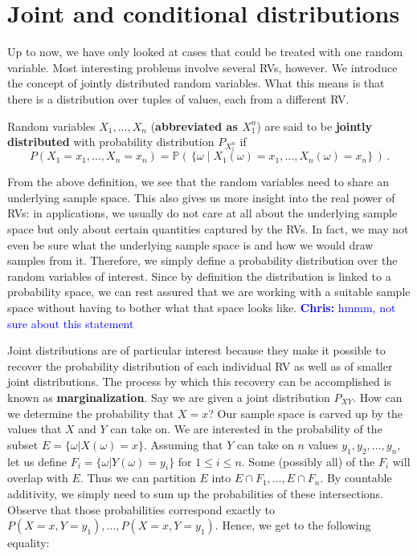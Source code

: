 \documentclass[a4paper,11pt,leqno]{report}
\newcommand{\chris}[1]{ \textcolor{blue}{\textbf{Chris:} #1}}
\begin{document}
\section{Joint and conditional distributions}

Up to now, we have only looked at cases that could be treated with one random variable. Most interesting problems involve several RVs, however. We introduce the concept of jointly distributed random variables. What this means is that
there is a distribution over tuples of values, each from a different RV.

\begin{Definition}
Random variables $ X_{1}, \ldots, X_{n} $ (\textbf{abbreviated as $ X^{n}_{1} $}) 
are said to be \textbf{jointly distributed} with probability distribution $ P_{X_{1}^{n}} $ if
$$ P(X_{1}=x_{1}, \ldots, X_{n}=x_{n}) = \mathbb{P}(\, \{\omega \mid
X_{1}(\omega) = x_{1}, \ldots, X_{n}(\omega)=x_{n}\}\, ) \, . $$ 
\end{Definition}

From the above definition, we see that the random variables need to
share an underlying sample space. This also gives us more insight into
the real power of RVs: in applications, we usually do not care at all
about the underlying sample space but only about certain quantities
captured by the RVs. In fact, we may not even be sure what the
underlying sample space is and how we would draw samples from
it. Therefore, we simply define a probability distribution over the
random variables of interest. Since by definition the distribution is
linked to a probability space, we can rest assured that we are working
with a suitable sample space without having to bother what that space
looks like. \chris{hmmm, not sure about this statement}

Joint distributions are of particular interest because they make it possible to recover the probability distribution of each individual
RV as well as of smaller joint distributions. The process by which this recovery can be accomplished is known as \textbf{marginalization}. Say
we are given a joint distribution $ P_{XY} $. How can we determine the probability that $ X=x $? Our sample space is carved
up by the values that $ X $ and $ Y $ can take on. We are interested in the probability of the subset $ E = \{\omega|X(\omega)=x\} $.
Assuming that $ Y $ can take on $ n $ values $y_1,y_2,\ldots,y_n$, let us define $ F_{i} = \{\omega| Y(\omega) = y_{i}\} $ for $ 1 \leq i \leq n $.
Some (possibly all) of the $ F_{i} $ will overlap with $ E $. Thus we can partition $ E $ into $ E\cap F_{1}, \ldots, E \cap F_{n} $.
By countable additivity, we simply need to sum up the probabilities of these intersections. Observe that those probabilities correspond exactly to $ P(X=x,Y=y_{1}), \ldots, P(X=x,Y=y_{1}) $. Hence, we get to the following equality:
\end{document}
